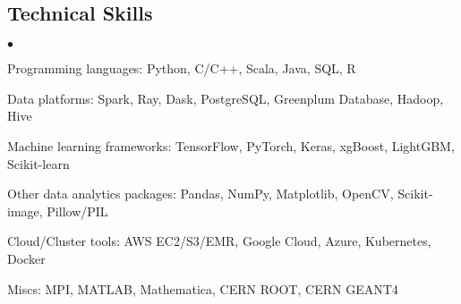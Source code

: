 \documentclass[margin,line]{res}
\newenvironment{list2}{
 \begin{list}{$\bullet$}{%
   \setlength{\itemsep}{0in}
   \setlength{\parsep}{0in} \setlength{\parskip}{0in}
   \setlength{\topsep}{0in} \setlength{\partopsep}{0in} 
   \setlength{\leftmargin}{0.2in}}}{\end{list}}
\begin{document}
\begin{resume}
\section{\sc Technical Skills} 
\begin{list2}
\item Programming languages: Python, C/C++, Scala, Java, SQL, R
\item Data platforms: Spark, Ray, Dask, PostgreSQL, Greenplum Database, Hadoop, Hive
\item Machine learning frameworks: TensorFlow, PyTorch, Keras, xgBoost, LightGBM, Scikit-learn
\item Other data analytics packages: Pandas, NumPy, Matplotlib, OpenCV, Scikit-image, Pillow/PIL
\item Cloud/Cluster tools: AWS EC2/S3/EMR, Google Cloud, Azure, Kubernetes, Docker
\item Miscs: MPI, MATLAB, Mathematica, CERN ROOT, CERN GEANT4\\ 
\end{list2}



\end{resume}
\end{document}
